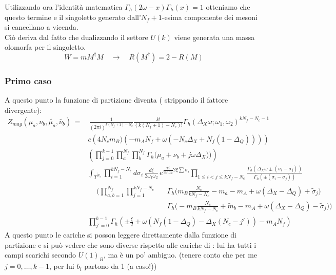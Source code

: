 \documentclass[a4paper,12pt]{article}
\begin{document}
Utilizzando ora l'identità matematica $ \Gamma_h ( 2 \omega - x  ) \Gamma_h ( x  ) =  1 $ otteniamo che questo termine e il singoletto generato dall'$N_f+1$-esima componente dei mesoni si cancellano a vicenda.\\
Ciò deriva dal fatto che dualizzando il settore $U(k)$ viene generata una massa olomorfa per il singoletto.
\begin{equation}
	W = m M^{\dagger} M \quad \longrightarrow \quad R(M^{\dagger}) = 2 - R (M)
\end{equation}
\subsubsection{Primo caso}
A questo punto la funzione di partizione diventa ( strippando il fattore divergente):
\begin{align*}
Z_{mag} ( \mu_a , \nu_b , \tilde{\mu_a}, \tilde{\nu_b} ) \,= & \, \frac{1}{(2 \pi i )^{k(N_f+1) - N_c}}\frac{k!}{ (k(N_f+1) - N_c)! }
 \Gamma_h ( \Delta_X \omega ; \omega_1 , \omega_2)^{ k N_f - N_c -1}  \\
  & c \left( 4 N_c m_B) ( - m_A N_f + \omega( -N_c \Delta_X + N_f ( 1 - \Delta_Q))) \right) \\
 &  \left( \prod_{j=0}^{k-1}
\prod_a^{N_f } \prod_b^{N_f}  \Gamma_h \big( \mu_a+  \nu_b + j \omega \Delta_X) \big)  \right) \\
&\int_{T^{\tilde{N}_c}}  \prod_{i=1}^{ k N_f - N_c } d \sigma_i \,
\frac{d \xi}{2 \omega_1 \omega_2} \, e^{ \frac{\pi i }{ 2 \omega_1 \omega_2} 2 \xi  \sum \sigma_i }  \prod_{ 1 \leq i<j \leq k N_f - N_c } \frac{ \Gamma_h( \Delta_X \omega \pm (\sigma_i - \sigma_j)) }{ \Gamma_h ( \pm (\sigma_i - \sigma_j) )}
  \\&
\begin{aligned}
   &  \bigg( \prod_{a,b=1}^{N_f} \prod_{j=1}^{k N_f - N_c }
   && \Gamma_h \big( m_B \frac{N_c}{ k N_f-N_c} - m_a - m_A + \omega (\Delta_X - \Delta_Q)  + \tilde{\sigma}_j \big) \\
 & && \Gamma_h \big(  -m_B \frac{N_c}{k N_f-N_c} + \tilde{m}_b - m_A + \omega (\Delta_X - \Delta_Q)  - \tilde{\sigma}_j \big)  \bigg)
  \end{aligned}
  \\
  & \prod_{j'=0}^{k-1} \Gamma_h \left( \pm \frac{\xi}{2} +\omega \left(
  N_f ( 1 - \Delta_Q ) - \Delta_X ( N_c - j')  \right) - m_A N_f
 \right)
\end{align*}
A questo punto le cariche si posson leggere direttamente dalla funzione di partizione e si può vedere che sono diverse rispetto alle cariche di \citep{Nii:2014jsa}: lui ha tutti i campi scarichi secondo $U(1)_B$, ma è un po' ambiguo. (tenere conto che per me $j = 0, \dots ,k-1$, per lui $b_i$ partono da 1 (a caso!))
\end{document}
